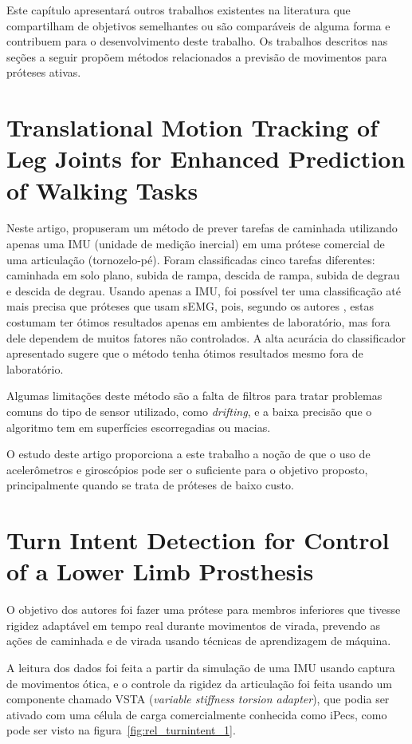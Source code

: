 Este capítulo apresentará outros trabalhos existentes na literatura que compartilham de objetivos semelhantes ou são comparáveis de alguma forma e contribuem para o desenvolvimento deste trabalho. Os trabalhos descritos nas seções a seguir propõem métodos relacionados a previsão de movimentos para próteses ativas.

\section{Translational Motion Tracking of Leg Joints for Enhanced Prediction of Walking Tasks}
\label{sec:rel_stolyarov}
Neste artigo,  propuseram um método de prever tarefas de caminhada utilizando apenas uma IMU (unidade de medição inercial) em uma prótese comercial de uma articulação (tornozelo-pé). Foram classificadas cinco tarefas diferentes: caminhada em solo plano, subida de rampa, descida de rampa, subida de degrau e descida de degrau. Usando apenas a IMU, foi possível ter uma classificação até mais precisa que próteses que usam sEMG, pois, segundo os autores , estas costumam ter ótimos resultados apenas em ambientes de laboratório, mas fora dele dependem de muitos fatores não controlados. A alta acurácia do classificador apresentado sugere que o método tenha ótimos resultados mesmo fora de laboratório.

Algumas limitações deste método são a falta de filtros para tratar problemas comuns do tipo de sensor utilizado, como \textit{drifting}, e a baixa precisão que o algoritmo tem em superfícies escorregadias ou macias.

O estudo deste artigo proporciona a este trabalho a noção de que o uso de acelerômetros e giroscópios pode ser o suficiente para o objetivo proposto, principalmente quando se trata de próteses de baixo custo.

\section{Turn Intent Detection for Control of a Lower Limb Prosthesis}
\label{sec:rel_pew}
O objetivo dos autores  foi fazer uma prótese para membros inferiores que tivesse rigidez adaptável em tempo real durante movimentos de virada, prevendo as ações de caminhada e de virada usando técnicas de aprendizagem de máquina. 

A leitura dos dados foi feita a partir da simulação de uma IMU usando captura de movimentos ótica, e o controle da rigidez da articulação foi feita usando um componente chamado VSTA (\textit{variable stiffness torsion adapter}), que podia ser ativado com uma célula de carga comercialmente conhecida como iPecs, como pode ser visto na figura~\ref{fig:rel_turnintent_1}.

